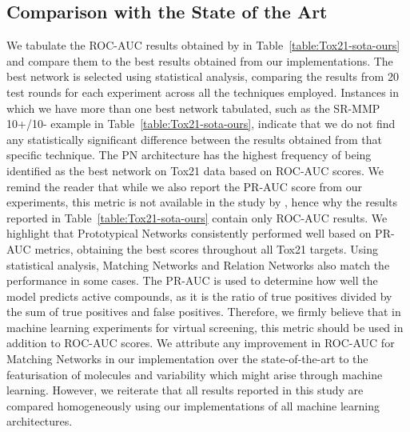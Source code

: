 \documentclass[journal=jcisd8,manuscript=article]{achemso} %
\begin{document}
\subsection{Comparison with the State of the Art}

We tabulate the ROC-AUC results obtained by \citet{altae2017low} in Table~\ref{table:Tox21-sota-ours} and compare them to the best results obtained from our implementations. The best network is selected using statistical analysis, comparing the results from 20 test rounds for each experiment across all the techniques employed. Instances in which we have more than one best network tabulated, such as the SR-MMP 10+/10- example in Table~\ref{table:Tox21-sota-ours}, indicate that we do not find any statistically significant difference between the results obtained from that specific technique. The PN architecture has the highest frequency of being identified as the best network on Tox21 data based on ROC-AUC scores. We remind the reader that while we also report the PR-AUC score from our experiments, this metric is not available in the study by \citet{altae2017low}, hence why the results reported in Table~\ref{table:Tox21-sota-ours} contain only ROC-AUC results. We highlight that Prototypical Networks consistently performed well based on PR-AUC metrics, obtaining the best scores throughout all Tox21 targets. Using statistical analysis, Matching Networks and Relation Networks also match the performance in some cases. The PR-AUC is used to determine how well the model predicts active compounds, as it is the ratio of true positives divided by the sum of true positives and false positives. Therefore, we firmly believe that in machine learning experiments for virtual screening, this metric should be used in addition to ROC-AUC scores. We attribute any improvement in ROC-AUC for Matching Networks in our implementation over the state-of-the-art to the featurisation of molecules and variability which might arise through machine learning. However, we reiterate that all results reported in this study are compared homogeneously using our implementations of all machine learning architectures.
\end{document}
